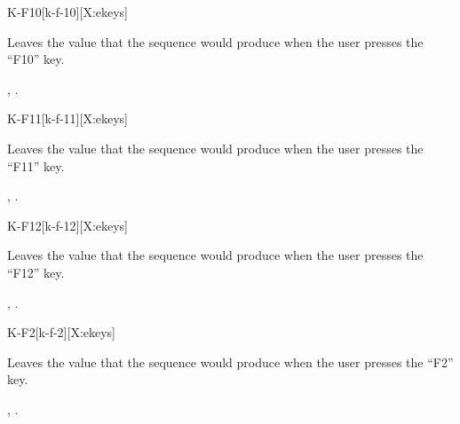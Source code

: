 \begin{worddef*}{}{K-F10}[k-f-10][X:ekeys]
\item {}

	Leaves the value  that the sequence 
	 would produce when the user presses the
	``F10'' key.


\see {},
	.
\end{worddef*}


\begin{worddef*}{}{K-F11}[k-f-11][X:ekeys]
\item {}

	Leaves the value  that the sequence 
	 would produce when the user presses the
	``F11'' key.


\see {},
	.
\end{worddef*}


\begin{worddef*}{}{K-F12}[k-f-12][X:ekeys]
\item {}

	Leaves the value  that the sequence 
	 would produce when the user presses the
	``F12'' key.


\see {},
	.
\end{worddef*}


\begin{worddef*}{}{K-F2}[k-f-2][X:ekeys]
\item {}

	Leaves the value  that the sequence 
	 would produce when the user presses the
	``F2'' key.


\see {},
	.
\end{worddef*}


